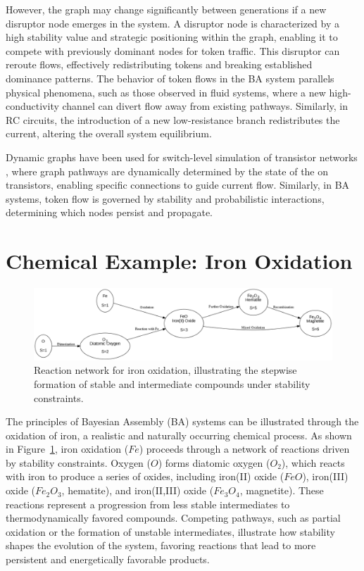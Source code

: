 \documentclass[preprint,12pt]{elsarticle}
\begin{document}
However, the graph may change significantly between generations if a new disruptor node emerges in the system. A disruptor node is characterized by a high stability value and strategic positioning within the graph, enabling it to compete with previously dominant nodes for token traffic. This disruptor can reroute flows, effectively redistributing tokens and breaking established dominance patterns. The behavior of token flows in the BA system parallels physical phenomena, such as those observed in fluid systems, where a new high-conductivity channel can divert flow away from existing pathways. Similarly, in RC circuits, the introduction of a new low-resistance branch redistributes the current, altering the overall system equilibrium. 

Dynamic graphs have been used for switch-level simulation of transistor networks \cite{AdlerCAD}, where graph pathways are dynamically determined by the state of the on transistors, enabling specific connections to guide current flow. Similarly, in BA systems, token flow is governed by stability and probabilistic interactions, determining which nodes persist and propagate.

\section{Chemical Example: Iron Oxidation}

\begin{figure}[h]
    \centering
    \includegraphics[width=1\textwidth,height=0.4\textwidth]{figure_6.png}
    \caption{Reaction network for iron oxidation, illustrating the stepwise formation of stable and intermediate compounds under stability constraints.}
    \label{fig:figure_6}
\end{figure}

The principles of Bayesian Assembly (BA) systems can be illustrated through the oxidation of iron, a realistic and naturally occurring chemical process. As shown in Figure~\ref{fig:figure_6}, iron oxidation (\(Fe\)) proceeds through a network of reactions driven by stability constraints. Oxygen (\(O\)) forms diatomic oxygen (\(O_2\)), which reacts with iron to produce a series of oxides, including iron(II) oxide (\(FeO\)), iron(III) oxide (\(Fe_2O_3\), hematite), and iron(II,III) oxide (\(Fe_3O_4\), magnetite). These reactions represent a progression from less stable intermediates to thermodynamically favored compounds. Competing pathways, such as partial oxidation or the formation of unstable intermediates, illustrate how stability shapes the evolution of the system, favoring reactions that lead to more persistent and energetically favorable products.
\end{document}
